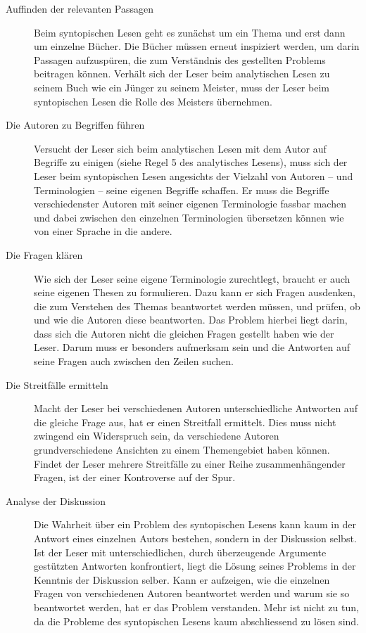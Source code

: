 \documentclass[a4paper,11pt]{scrartcl}
\begin{document}
\begin{description}
    \item[Auffinden der relevanten Passagen] Beim syntopischen Lesen geht es zunächst um ein Thema und erst dann um einzelne Bücher. Die Bücher müssen erneut inspiziert werden, um darin Passagen aufzuspüren, die zum Verständnis des gestellten Problems beitragen können. Verhält sich der Leser beim analytischen Lesen zu seinem Buch wie ein Jünger zu seinem Meister, muss der Leser beim syntopischen Lesen die Rolle des Meisters übernehmen.
    \item[Die Autoren zu Begriffen führen] Versucht der Leser sich beim analytischen Lesen mit dem Autor auf Begriffe zu einigen (siehe Regel 5 des analytisches Lesens), muss sich der Leser beim syntopischen Lesen angesichts der Vielzahl von Autoren – und Terminologien – seine eigenen Begriffe schaffen. Er muss die Begriffe verschiedenster Autoren mit seiner eigenen Terminologie fassbar machen und dabei zwischen den einzelnen Terminologien übersetzen können wie von einer Sprache in die andere.
    \item[Die Fragen klären] Wie sich der Leser seine eigene Terminologie zurechtlegt, braucht er auch seine eigenen Thesen zu formulieren. Dazu kann er sich Fragen ausdenken, die zum Verstehen des Themas beantwortet werden müssen, und prüfen, ob und wie die Autoren diese beantworten. Das Problem hierbei liegt darin, dass sich die Autoren nicht die gleichen Fragen gestellt haben wie der Leser. Darum muss er besonders aufmerksam sein und die Antworten auf seine Fragen auch zwischen den Zeilen suchen.
    \item[Die Streitfälle ermitteln] Macht der Leser bei verschiedenen Autoren unterschiedliche Antworten auf die gleiche Frage aus, hat er einen Streitfall ermittelt. Dies muss nicht zwingend ein Widerspruch sein, da verschiedene Autoren grundverschiedene Ansichten zu einem Themengebiet haben können. Findet der Leser mehrere Streitfälle zu einer Reihe zusammenhängender Fragen, ist der einer Kontroverse auf der Spur.
    \item[Analyse der Diskussion] Die Wahrheit über ein Problem des syntopischen Lesens kann kaum in der Antwort eines einzelnen Autors bestehen, sondern in der Diskussion selbst. Ist der Leser mit unterschiedlichen, durch überzeugende Argumente gestützten Antworten konfrontiert, liegt die Lösung seines Problems in der Kenntnis der Diskussion selber. Kann er aufzeigen, wie die einzelnen Fragen von verschiedenen Autoren beantwortet werden und warum sie so beantwortet werden, hat er das Problem verstanden. Mehr ist nicht zu tun, da die Probleme des syntopischen Lesens kaum abschliessend zu lösen sind.
\end{description}
\end{document}
